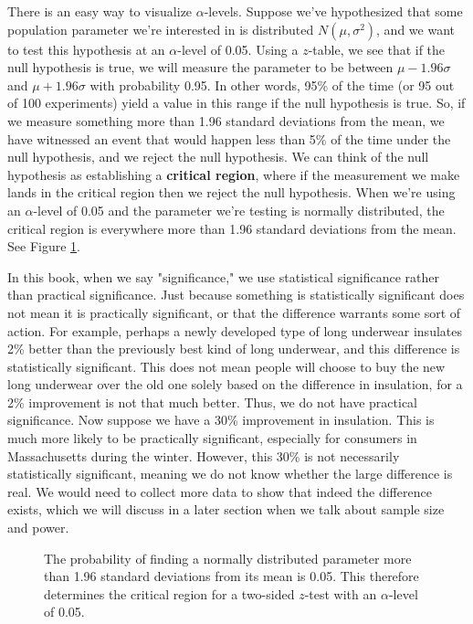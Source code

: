 There is an easy way to visualize $\alpha$-levels.  Suppose we've hypothesized that some population parameter we're interested in is distributed $N(\mu,\sigma^2)$, and we want to test this hypothesis at an $\alpha$-level of 0.05.  Using a $z$-table, we see that if the null hypothesis is true, we will measure the parameter to be between $\mu - 1.96\sigma$ and $\mu + 1.96\sigma$ with probability 0.95. In other words, 95\% of the time (or 95 out of 100 experiments) yield a value in this range if the null hypothesis is true.  So, if we measure something more than 1.96 standard deviations from the mean, we have witnessed an event that would happen less than 5\% of the time under the null hypothesis, and we reject the null hypothesis.  We can think of the null hypothesis as establishing a \textbf{critical region},  where if the measurement we make lands in the critical region then we reject the null hypothesis.  When we're using an $\alpha$-level of 0.05 and the parameter we're testing is normally distributed, the critical region is everywhere more than 1.96 standard deviations from the mean.  See Figure \ref{fig:twosidedz}.

In this book, when we say "significance," we use statistical significance rather than practical significance. Just because something is statistically significant does not mean it is practically significant, or that the difference warrants some sort of action. For example, perhaps a newly developed type of long underwear insulates 2\% better than the previously best kind of long underwear, and this difference is statistically significant. This does not mean people will choose to buy the new long underwear over the old one solely based on the difference in insulation, for a 2\% improvement is not that much better. Thus, we do not have practical significance. Now suppose we 
have a 30\% improvement in insulation. This is much more likely to be practically significant, especially for consumers in Massachusetts during the winter. However, this 30\% is not necessarily statistically significant, meaning we do not know whether the large difference is real. We would need to collect more data to show that indeed the difference exists, which we will discuss in a later section when we talk about sample size and power. 
\begin{figure}[h!]
\begin{center}
\caption{\label{fig:twosidedz} The probability of finding a normally distributed parameter more than 1.96 standard deviations from its mean is 0.05.  This therefore determines the critical region for a two-sided $z$-test with an $\alpha$-level of 0.05.}
\end{center}\end{figure}


